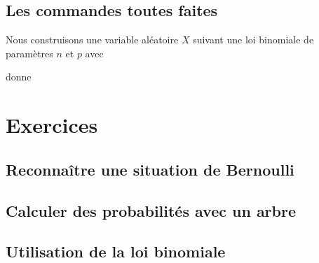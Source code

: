 \subsection{Les commandes toutes faites}

Nous construisons une variable aléatoire \( X\) suivant une loi binomiale de paramètres \( n\) et \( p\) avec


donne


\section{Exercices }

\subsection{Reconnaître une situation de Bernoulli}


\subsection{Calculer des probabilités avec un arbre}


\subsection{Utilisation de la loi binomiale}


